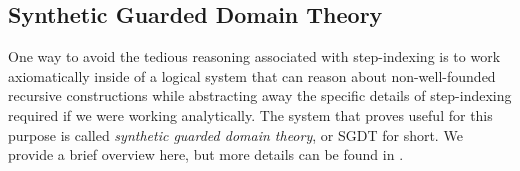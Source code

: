   \begin{comment}
  As another example, the axioms that specify the behavior of casts do not hold in the
  step-indexed setting. Consider, for example, the ``lower bound'' rule for downcasting:

  \begin{mathpar}
    \inferrule*
    {\gamlt \vdash M \ltdyn N : dyn}
    {\gamlt \vdash \dn{\dyn \ra \dyn}{\dyn} M \ltdyn N}
  \end{mathpar}

  In the language of the step-indexed logical relation used in prior work, this would
  take the form
  
  \begin{mathpar}
    \inferrule*
    {(M, N) \in \mathcal{E}^{\sim}_{i}\sem{\dyn}}
    {(\dn{\dyn \ra \dyn}{\dyn} M, N) \in \mathcal{E}^{\sim}_{i}\sem{\injarr{}}}
  \end{mathpar}

  where $\sim$ stands for $\mathrel{\preceq}$ or $\mathrel{\succeq}$, i.e.,
  counting steps on the left or right respectively.
  To show this, we would use the fact that the left-hand side steps and
  apply an anti-reduction lemma, showing that the term to which the LHS steps
  is related to the RHS where our fuel is now
  
  The left-hand side steps to a case inspection on $M$,
  where we unfold the recursive $\dyn$ type into a sum type and see whether the result
  is a function type.

  One way around these difficulties is to demand that the rules only hold
  ``extensionally'', i.e., we quantify universally over the step-index and
  reason about the ``global'' behavior of terms for all possible step indices.
  This is the approach taken in prior work.
\end{comment}


\subsection{Synthetic Guarded Domain Theory}
One way to avoid the tedious reasoning associated with step-indexing is to work
axiomatically inside of a logical system that can reason about non-well-founded recursive
constructions while abstracting away the specific details of step-indexing required
if we were working analytically.
The system that proves useful for this purpose is called \emph{synthetic guarded
domain theory}, or SGDT for short. We provide a brief overview here, but more
details can be found in \cite{birkedal-mogelberg-schwinghammer-stovring2011}.


